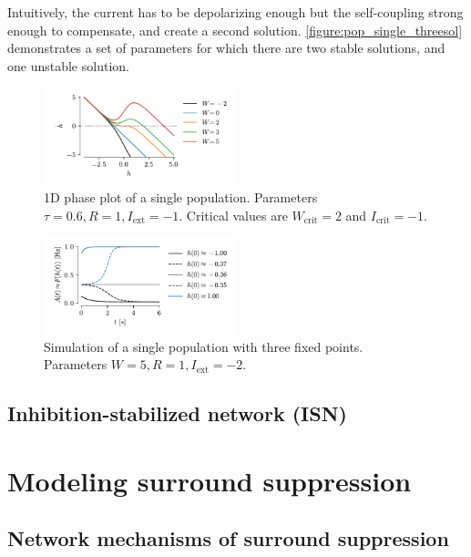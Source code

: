\documentclass[10pt,conference,compsocconf,a4paper]{IEEEtran}
\newcommand*{\shortautoref}[1]{%
	\begingroup
	\def\equationautorefname{\textsc{Eq.}}%
	\def\tableautorefname{\textsc{Tab.}}%
	\def\figureautorefname{\textsc{Fig.}}%
	\autoref{#1}%
	\endgroup
}
\begin{document}
		Intuitively, the current has to be depolarizing enough but the self-coupling strong enough to compensate, and create a second solution. \shortautoref{figure:pop_single_threesol} demonstrates a set of parameters for which there are two stable solutions, and one unstable solution.

		\begin{figure}
			\centering
			\includegraphics[width=0.5\textwidth]{figures/pop_single_nonlin_phase.pdf}
			\caption{1D phase plot of a single population. Parameters $\tau = 0.6, R = 1, I_{\text{ext}}= -1$. Critical values are $W_{\text{crit}} = 2$ and $I_{\text{crit}} = -1$.}
			\label{figure:pop_single_nonlin_phase}
		\end{figure}

		\begin{figure}
			\centering
			\includegraphics[width=0.5\textwidth]{figures/pop_single_threesol.pdf}
			\caption{Simulation of a single population with three fixed points. Parameters $W = 5, R = 1, I_{\text{ext}} = -2$.}
			\label{figure:pop_single_threesol}
		\end{figure}

	\subsection{Inhibition-stabilized network (ISN)}
	\label{sec12}

\section{Modeling surround suppression}
\label{sec2}

	\subsection{Network mechanisms of surround suppression}
	\label{sec21}
\end{document}
